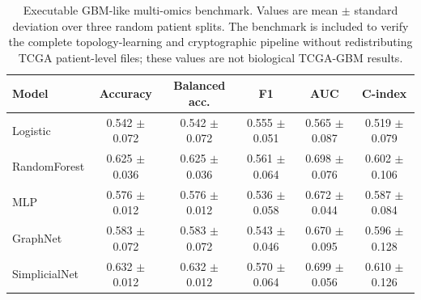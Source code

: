\begin{table}[t]
\centering
\caption{Executable GBM-like multi-omics benchmark. Values are mean $\pm$ standard deviation over three random patient splits. The benchmark is included to verify the complete topology-learning and cryptographic pipeline without redistributing TCGA patient-level files; these values are not biological TCGA-GBM results.}
\label{tab:demo_results}
\small
\begin{tabular}{lccccc}
\toprule
Model & Accuracy & Balanced acc. & F1 & AUC & C-index \\
\midrule
Logistic & 0.542 $\pm$ 0.072 & 0.542 $\pm$ 0.072 & 0.555 $\pm$ 0.051 & 0.565 $\pm$ 0.087 & 0.519 $\pm$ 0.079 \\
RandomForest & 0.625 $\pm$ 0.036 & 0.625 $\pm$ 0.036 & 0.561 $\pm$ 0.064 & 0.698 $\pm$ 0.076 & 0.602 $\pm$ 0.106 \\
MLP & 0.576 $\pm$ 0.012 & 0.576 $\pm$ 0.012 & 0.536 $\pm$ 0.058 & 0.672 $\pm$ 0.044 & 0.587 $\pm$ 0.084 \\
GraphNet & 0.583 $\pm$ 0.072 & 0.583 $\pm$ 0.072 & 0.543 $\pm$ 0.046 & 0.670 $\pm$ 0.095 & 0.596 $\pm$ 0.128 \\
SimplicialNet & 0.632 $\pm$ 0.012 & 0.632 $\pm$ 0.012 & 0.570 $\pm$ 0.064 & 0.699 $\pm$ 0.056 & 0.610 $\pm$ 0.126 \\
\bottomrule
\end{tabular}
\end{table}